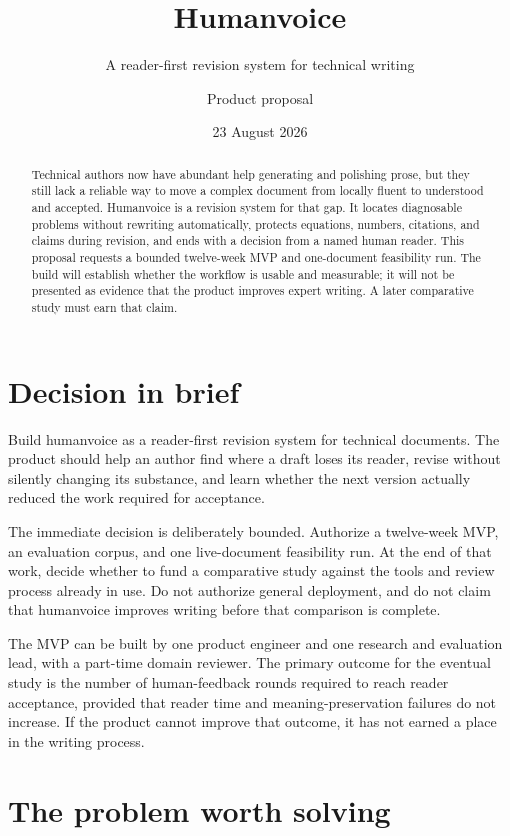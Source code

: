 \documentclass[
  11pt,
  english,
]{article}
\title{Humanvoice}
\subtitle{A reader-first revision system for technical writing}
\author{Product proposal}
\date{23 August 2026}
\begin{document}
\maketitle
\begin{abstract}
Technical authors now have abundant help generating and polishing prose,
but they still lack a reliable way to move a complex document from
locally fluent to understood and accepted. Humanvoice is a revision
system for that gap. It locates diagnosable problems without rewriting
automatically, protects equations, numbers, citations, and claims during
revision, and ends with a decision from a named human reader. This
proposal requests a bounded twelve-week MVP and one-document feasibility
run. The build will establish whether the workflow is usable and
measurable; it will not be presented as evidence that the product
improves expert writing. A later comparative study must earn that claim.
\end{abstract}

\hypertarget{decision-in-brief}{%
\section{Decision in brief}\label{decision-in-brief}}

Build humanvoice as a reader-first revision system for technical
documents. The product should help an author find where a draft loses
its reader, revise without silently changing its substance, and learn
whether the next version actually reduced the work required for
acceptance.

The immediate decision is deliberately bounded. Authorize a twelve-week
MVP, an evaluation corpus, and one live-document feasibility run. At the
end of that work, decide whether to fund a comparative study against the
tools and review process already in use. Do not authorize general
deployment, and do not claim that humanvoice improves writing before
that comparison is complete.

The MVP can be built by one product engineer and one research and
evaluation lead, with a part-time domain reviewer. The primary outcome
for the eventual study is the number of human-feedback rounds required
to reach reader acceptance, provided that reader time and
meaning-preservation failures do not increase. If the product cannot
improve that outcome, it has not earned a place in the writing process.

\hypertarget{the-problem-worth-solving}{%
\section{The problem worth solving}\label{the-problem-worth-solving}}
\end{document}
